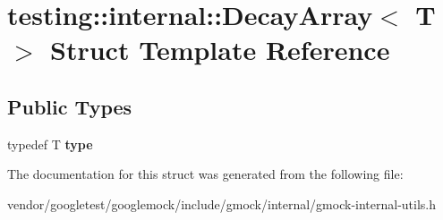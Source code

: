 \hypertarget{structtesting_1_1internal_1_1_decay_array}{}\section{testing\+:\+:internal\+:\+:Decay\+Array$<$ T $>$ Struct Template Reference}
\label{structtesting_1_1internal_1_1_decay_array}
\subsection*{Public Types}
\begin{DoxyCompactItemize}
\item 
\mbox{\label{structtesting_1_1internal_1_1_decay_array_a39803f9bafd56bc4531f86eb34fe9c0f}} 
typedef T {\bfseries type}
\end{DoxyCompactItemize}


The documentation for this struct was generated from the following file\+:\begin{DoxyCompactItemize}
\item 
vendor/googletest/googlemock/include/gmock/internal/gmock-\/internal-\/utils.\+h\end{DoxyCompactItemize}
